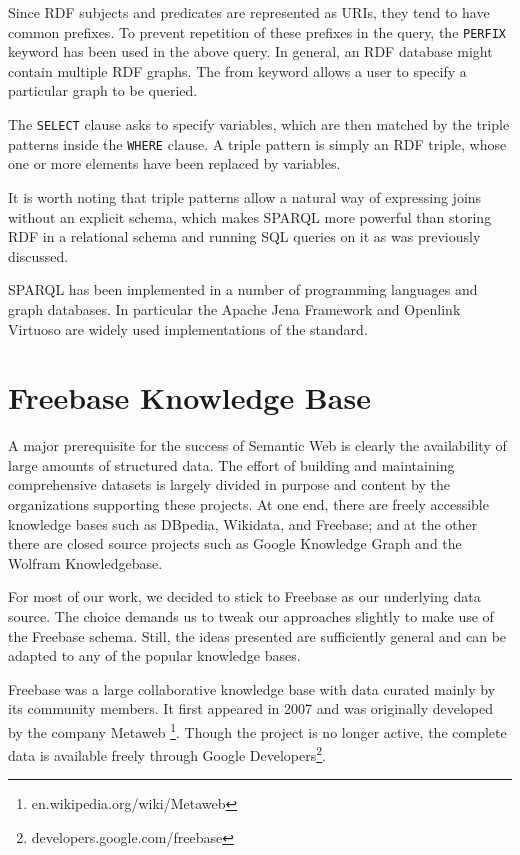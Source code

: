 Since RDF subjects and predicates are represented as URIs, they tend to have common prefixes. To prevent repetition of these prefixes in the query, the \verb|PERFIX| keyword has been used in the above query. In general, an RDF database might contain multiple RDF graphs. The from keyword allows a user to specify a particular graph to be queried.

The \verb|SELECT| clause asks to specify variables, which are then matched by the triple patterns inside the \verb|WHERE| clause. A triple pattern is simply an RDF triple, whose one or more elements have been replaced by variables. 

It is worth noting that triple patterns allow a natural way of expressing joins without an explicit schema, which makes SPARQL more powerful than storing RDF in a relational schema and running SQL queries on it as was previously discussed.

SPARQL has been implemented in a number of programming languages and graph databases. In particular the Apache Jena Framework and Openlink Virtuoso are widely used implementations of the standard.

\section{Freebase Knowledge Base}

A major prerequisite for the success of Semantic Web is clearly the availability of large amounts of structured data. The effort of building and maintaining comprehensive datasets is largely divided in purpose and content by the organizations supporting these projects. At one end, there are freely accessible knowledge bases such as DBpedia, Wikidata, and Freebase; and at the other there are closed source projects such as Google Knowledge Graph and the Wolfram Knowledgebase. 

For most of our work, we decided to stick to Freebase as our underlying data source. The choice demands us to tweak our approaches slightly to make use of the Freebase schema. Still, the ideas presented are sufficiently general and can be adapted to any of the popular knowledge bases.

Freebase was a large collaborative knowledge base with data curated mainly by its community members. It first appeared in 2007 and was originally developed by the company Metaweb \footnote{en.wikipedia.org/wiki/Metaweb}. Though the project is no longer active, the complete data is available freely through Google Developers\footnote{developers.google.com/freebase}.


